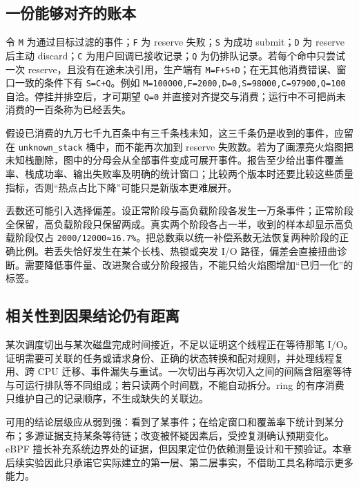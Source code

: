 \documentclass[UTF8,fontset=fandol,openany,11pt]{ctexbook}
\begin{document}
\subsection{一份能够对齐的账本}

令 \texttt{M} 为通过目标过滤的事件；\texttt{F} 为 reserve 失败；\texttt{S} 为成功 submit；\texttt{D} 为 reserve 后主动 discard；\texttt{C} 为用户回调已接收记录；\texttt{Q} 为仍排队记录。若每个命中只尝试一次 reserve，且没有在途未决引用，生产端有 \texttt{M=F+S+D}；在无其他消费错误、窗口一致的条件下有 \texttt{S=C+Q}。例如 \texttt{M=100000,\allowbreak{}F=2000,\allowbreak{}D=0,\allowbreak{}S=98000,\allowbreak{}C=97900,\allowbreak{}Q=100} 自洽。停挂并排空后，才可期望 \texttt{Q=0} 并直接对齐提交与消费；运行中不可把尚未消费的一百条称为已经丢失。\cite{eb-ring-code}\cite{eb-ring-consume}


假设已消费的九万七千九百条中有三千条栈未知，这三千条仍是收到的事件，应留在 \texttt{unknown\_\allowbreak{}stack} 桶中，而不能再次加到 reserve 失败数。若为了画漂亮火焰图把未知栈删除，图中的分母会从全部事件变成可展开事件。报告至少给出事件覆盖率、栈成功率、输出失败率及明确的统计窗口；比较两个版本时还要比较这些质量指标，否则“热点占比下降”可能只是新版本更难展开。\cite{eb-stack-helper}\cite{eb-stackmap}\cite{eb-ring-consume}


丢数还可能引入选择偏差。设正常阶段与高负载阶段各发生一万条事件；正常阶段全保留，高负载阶段只保留两成。真实两个阶段各占一半，收到的样本却显示高负载阶段仅占 \texttt{2000/\allowbreak{}12000≈16.\allowbreak{}7\%}。把总数乘以统一补偿系数无法恢复两种阶段的正确比例。若丢失恰好发生在某个长栈、热锁或突发 I/O 路径，偏差会直接扭曲诊断。需要降低事件量、改进聚合或分阶段报告，不能只给火焰图增加“已归一化”的标签。\cite{eb-ring-code}\cite{eb-perf-core}


\subsection{相关性到因果结论仍有距离}

某次调度切出与某次磁盘完成时间接近，不足以证明这个线程正在等待那笔 I/O。证明需要可关联的任务或请求身份、正确的状态转换和配对规则，并处理线程复用、跨 CPU 迁移、事件漏失与重试。一次切出与再次切入之间的间隔含阻塞等待与可运行排队等不同组成；若只读两个时间戳，不能自动拆分。ring 的有序消费只维护自己的记录顺序，不生成缺失的关联边。\cite{eb-sched-trace}\cite{eb-sched-core}\cite{eb-ring-doc}


可用的结论层级应从弱到强：看到了某事件；在给定窗口和覆盖率下统计到某分布；多源证据支持某条等待链；改变被怀疑因素后，受控复测确认预期变化。eBPF 擅长补充系统边界处的证据，但因果定位仍依赖测量设计和干预验证。本章后续实验因此只承诺它实际建立的第一层、第二层事实，不借助工具名称暗示更多能力。\cite{eb-go-runtime}\cite{eb-sched-core}\cite{eb-perf-abi}
\end{document}
